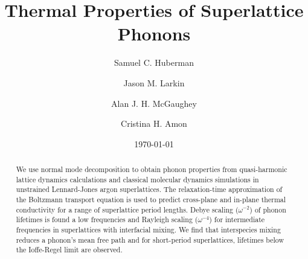 \documentclass[aps,prb,preprint,preprintnumbers,amsmath,amssymb,floatfix,superscriptaddress]{revtex4}
\begin{document}
\title{Thermal Properties of Superlattice Phonons}
\author{Samuel C. Huberman}
\author{Jason M. Larkin}
\author{Alan J. H. McGaughey}
\author{Cristina H. Amon}

\date{\today}%
\vspace{14mm}
  
\begin{abstract}

We use normal mode decomposition to obtain phonon properties from quasi-harmonic lattice dynamics calculations and classical molecular dynamics simulations in unstrained Lennard-Jones argon superlattices. The relaxation-time approximation of the Boltzmann transport equation is used to predict cross-plane and in-plane thermal conductivity for a range of superlattice period lengths. Debye scaling ($\omega^{-2}$) of phonon lifetimes is found a low frequencies and Rayleigh scaling ($\omega^{-4}$) for intermediate frequencies in superlattices with interfacial mixing. We find that interspecies mixing reduces a phonon's mean free path and for short-period superlattices, lifetimes below the Ioffe-Regel limit are observed.

\end{abstract}
\maketitle
\end{document}
